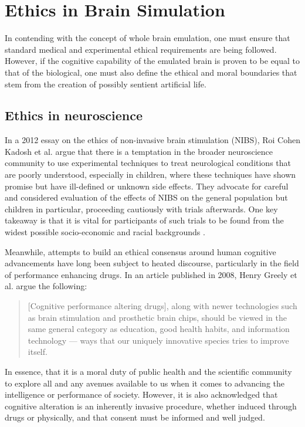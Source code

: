 \section{Ethics in Brain Simulation}

In contending with the concept of whole brain emulation, one must ensure that
standard medical and experimental ethical requirements are being followed.
However, if the cognitive capability of the emulated brain is proven to be equal
to that of the biological, one must also define the ethical and moral boundaries
that stem from the creation of possibly sentient artificial life. 

\subsection{Ethics in neuroscience}

In a 2012 essay on the ethics of non-invasive brain stimulation (NIBS), Roi
Cohen Kadosh et al. argue that there is a temptation in the broader neuroscience
community to use experimental techniques to treat neurological conditions that
are poorly understood, especially in children, where these techniques have shown
promise but have ill-defined or unknown side effects. They advocate for careful
and considered evaluation of the effects of NIBS on the general population but
children in particular, proceeding cautiously with trials afterwards. One key
takeaway is that it is vital for participants of such trials to be found from
the widest possible socio-economic and racial backgrounds
\autocite{kadosh_neuroethics_2012}. 

Meanwhile, attempts to build an ethical consensus around human cognitive
advancements have long been subject to heated discourse, particularly in the
field of performance enhancing drugs. In an article published in 2008, Henry
Greely et al. argue the following:

\begin{quote}
    [Cognitive performance altering drugs], along with newer technologies such
    as brain stimulation and prosthetic brain chips, should be viewed in the
    same general category as education, good health habits, and information
    technology — ways that our uniquely innovative species tries to improve
    itself.
    \begin{flushright}
        \textit{\autocite{greely_towards_2008}}
    \end{flushright}
\end{quote}

In essence, that it is a moral duty of public health and the scientific
community to explore all and any avenues available to us when it comes to
advancing the intelligence or performance of society. However, it is also
acknowledged that cognitive alteration is an inherently invasive procedure,
whether induced through drugs or physically, and that consent must be informed
and well judged. 
